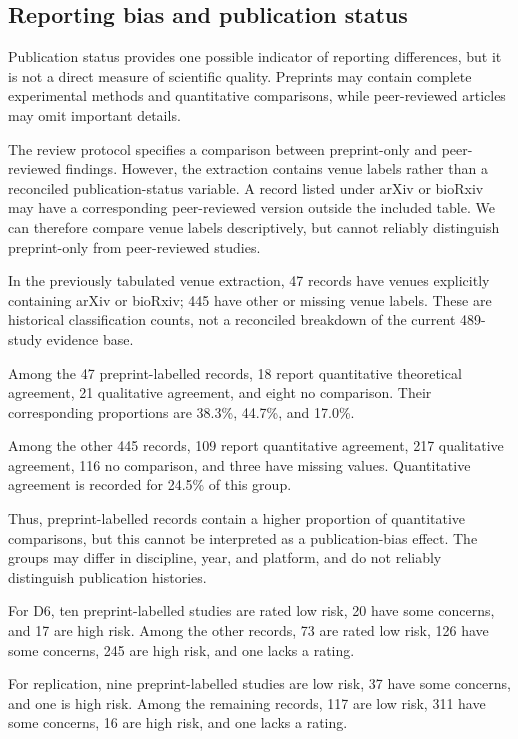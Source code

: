 \subsection{Reporting bias and publication status}
\label{sec:discussion-reporting}

Publication status provides one possible indicator
of reporting differences, but it is not a
direct measure of scientific quality.
Preprints may contain complete experimental
methods and quantitative comparisons,
while peer-reviewed articles may omit
important details.

The review protocol specifies a comparison
between preprint-only and peer-reviewed
findings. However, the extraction contains
venue labels rather than a reconciled
publication-status variable. A record
listed under arXiv or bioRxiv may have
a corresponding peer-reviewed version
outside the included table. We can
therefore compare venue labels
descriptively, but cannot reliably
distinguish preprint-only from
peer-reviewed studies.

In the previously tabulated venue
extraction, 47 records have venues
explicitly containing arXiv or bioRxiv;
445 have other or missing venue labels.
These are historical classification
counts, not a reconciled breakdown
of the current 489-study evidence base.

Among the 47 preprint-labelled records,
18 report quantitative theoretical
agreement, 21 qualitative agreement,
and eight no comparison. Their
corresponding proportions are
38.3\%, 44.7\%, and 17.0\%.

Among the other 445 records,
109 report quantitative agreement,
217 qualitative agreement,
116 no comparison, and three
have missing values.
Quantitative agreement is recorded
for 24.5\% of this group.

Thus, preprint-labelled records
contain a higher proportion of
quantitative comparisons, but
this cannot be interpreted
as a publication-bias effect.
The groups may differ in
discipline, year, and platform,
and do not reliably distinguish
publication histories.

For D6, ten preprint-labelled
studies are rated low risk,
20 have some concerns,
and 17 are high risk.
Among the other records,
73 are rated low risk,
126 have some concerns,
245 are high risk,
and one lacks a rating.

For replication, nine
preprint-labelled studies
are low risk,
37 have some concerns,
and one is high risk.
Among the remaining records,
117 are low risk,
311 have some concerns,
16 are high risk,
and one lacks a rating.


